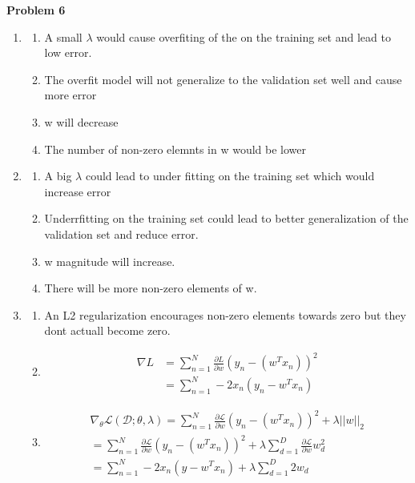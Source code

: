 \documentclass[11pt,letterpaper]{article}
\begin{document}
\textbf{Problem 6}
\begin{enumerate}[labelindent=0pt]
\item
	\begin{enumerate}[labelindent=0pt]
	\item
	A small $\lambda$ would cause overfiting of the on the training set
and lead to low error.
	\item
	The overfit model will not generalize to the validation set well and
cause more error
	\item
	w will decrease
	\item
	The number of non-zero elemnts in w would be lower
	\end{enumerate}
\item
	\begin{enumerate}[labelindent=0pt]
	\item
	A big $\lambda$ could lead to under fitting on the training set which
would increase error
	\item 
	Underrfitting on the training set could lead to better generalization of
the validation set and reduce error.
	\item
	w magnitude will increase.
	\item
	There will be more non-zero elements of w.
	\end{enumerate}
\item
	\begin{enumerate}[labelindent=0pt]
	\item
	An L2 regularization encourages non-zero elements towards zero but they
dont actuall become zero.	
	\item
	\begin{align*}
	\nabla L & =   \sum_{n=1}^{N} \tfrac{\partial L}{\partial w} (y_{n}-(w^Tx_{n}))^2
\\
	& = \sum_{n=1}^{N}-2x_{n}(y_{n}-w^Tx_{n})
	\end{align*}
	\item
	\begin{align*}
	\nabla_{\theta}\mathcal{L}(\mathcal{D};\theta,\lambda) =   \sum_{n=1}^{N}
	\tfrac{\partial \mathcal{L}}{\partial w} (y_{n}-(w^Tx_{n}))^2 + \lambda
	||w||_{2}\\
	 =   \sum_{n=1}^{N} \tfrac{\partial \mathcal{L}}{\partial w}
	(y_{n}-(w^Tx_{n}))^2 + \lambda \sum_{d=1}^{D} \tfrac{\partial
	\mathcal{L}}{\partial w}w_{d}^2\\
	= \sum_{n=1}^{N}-2x_{n}(y-w^Tx_{n}) + \lambda \sum_{d=1}^{D} 2w_{d}
	\end{align*}
	\end{enumerate}
\end{enumerate}
\end{document}
